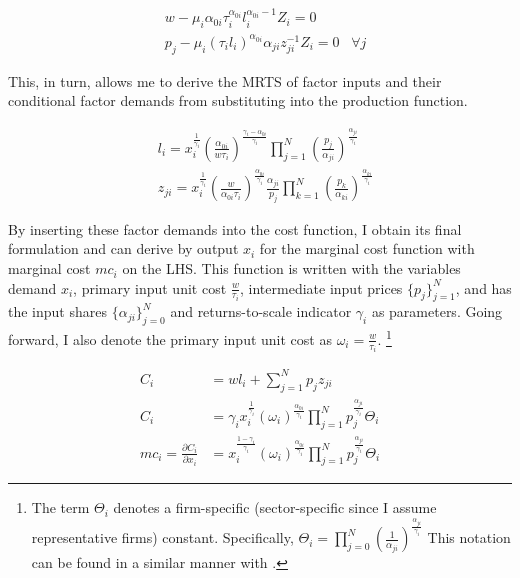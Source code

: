 \begin{equation} \label{eq:FOC}
\begin{split}
    & w - \mu_i\alpha_{0i}\tau_i^{\alpha_{0i}}l_i^{\alpha_{0i} -1} Z_i =0\\
    & p_j - \mu_i(\tau_i l_i)^{\alpha_{0i}} \alpha_{ji} z_{ji}^{-1} Z_i = 0 \hspace{10pt} \forall j
\end{split}
\end{equation}

This, in turn, allows me to derive the MRTS of factor inputs and their conditional factor demands from substituting into the
production function.

\begin{equation} \label{eq:CFD}
\begin{split}
    & l_i =  x_i^{\frac{1}{\gamma_i}} \left(\frac{\alpha_{0i}}{w \tau_i} \right)^{\frac{\gamma_i -\alpha_{0i}}{\gamma_i}} \prod_{j=1}^N \left(\frac{p_j}{\alpha_{ji}}\right)^{\frac{\alpha_{ji}}{\gamma_i}} \\
    & z_{ji} =  x_i^{\frac{1}{\gamma_i}} \left(\frac{w}{\alpha_{0i}\tau_i}\right)^{\frac{\alpha_{0i}}{\gamma_i}} \frac{\alpha_{ji}}{p_j} \prod_{k=1}^N \left( \frac{p_k}{\alpha_{ki}} \right)^{\frac{\alpha_{ki}}{\gamma_i}}
\end{split}
\end{equation}

By inserting these factor demands into the cost function, I obtain its final formulation and can derive by output $x_i$ for the marginal
cost function with marginal cost $mc_i$ on the LHS. This function is written with the variables demand $x_i$, primary input unit cost 
$\frac{w}{\tau_i}$, intermediate input prices $\{p_j\}_{j=1}^N$, and has the input shares $\{\alpha_{ji}\}_{j=0}^N$ and returns-to-scale 
indicator $\gamma_i$ as parameters. Going forward, I also denote the primary input unit cost as $\omega_i = \frac{w}{\tau_i}$.
\footnote{
The term $\Theta_i$ denotes a firm-specific (sector-specific since I assume representative firms) constant. Specifically, 
$\Theta_i = \prod_{j=0}^N \left(\frac{1}{\alpha_{ji}}\right)^{\frac{\alpha_{ji}}{\gamma_i}}$ This notation can be found in a similar 
manner with \textcite[footnote 19]{caliendo2015EstimatesTradeWelfare}.}

\begin{equation} \label{eq:cost_func}
\begin{split}
    C_i &= w l_i + \sum_{j=1}^N p_j z_{ji} \\
    C_i &= \gamma_i x_i^{\frac{1}{\gamma_i}} \left(\omega_i\right)^{\frac{\alpha_{0i}}{\gamma_i}} \prod_{j=1}^N p_j^{\frac{\alpha_{ji}}{\gamma_i}} \Theta_i\\
    mc_i =\frac{\partial C_i}{\partial x_i} &= x_i^{\frac{1 - \gamma_i}{\gamma_i}} \left(\omega_i \right)^{\frac{\alpha_{0i}}{\gamma_i}} \prod_{j=1}^N p_j^{\frac{\alpha_{ji}}{\gamma_i}} \Theta_i
\end{split}
\end{equation}

